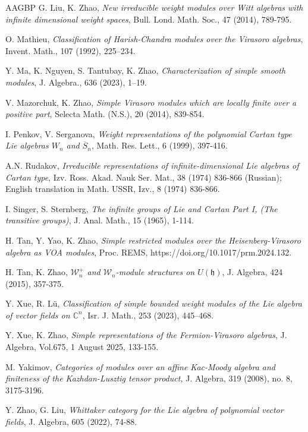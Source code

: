 \documentclass[12pt, a4paper]{amsart}
\theoremstyle{Theorem}
\theoremstyle{Theorem}
\numberwithin{equation}{section}
\begin{document}
\begin{thebibliography}{AAGBP}
 G. Liu, K. Zhao, {\it New irreducible weight modules over Witt algebras
	with infinite dimensional weight spaces}, Bull. Lond. Math. Soc., 47 (2014), 789-795.

 O. Mathieu, {\it Classification of Harish-Chandra modules over the Virasoro algebras}, Invent. Math., 107 (1992), 225–234.

 Y. Ma, K. Nguyen, S. Tantubay, K. Zhao, {\it Characterization of simple smooth modules}, J. Algebra., 636 (2023), 1–19.

 V. Mazorchuk, K. Zhao, {\it Simple Virasoro modules which are locally finite over a positive part}, Selecta Math. (N.S.), 20 (2014), 839-854.

 I. Penkov, V. Serganova, {\it Weight representations of the polynomial Cartan type Lie algebras $W_n$ and $\overline{S}_n$}, Math. Res. Lett., 6 (1999), 397-416.

 A.N. Rudakov, {\it Irreducible representations of infinite-dimensional Lie algebras of Cartan type},
Izv. Ross. Akad. Nauk Ser. Mat., 38 (1974) 836-866 (Russian); English translation in Math. USSR, Izv., 8 (1974) 836-866.

 I. Singer, S. Sternberg, {\it The infinite groups of Lie and Cartan Part I, (The transitive groups)}, J. Anal. Math., 15 (1965), 1-114.

 H. Tan,  Y. Yao,   K. Zhao, {\it Simple restricted modules over the   Heisenberg-Virasoro algebra as VOA modules}, Proc. REMS, https://doi.org/10.1017/prm.2024.132.


 H. Tan, K. Zhao, {\it $\mathcal{W}_{n}^{+}$ and $\mathcal{W}_{n}$-module structures on $U(\mathfrak{h})$},
J. Algebra, 424 (2015), 357-375.


 Y. Xue, R. Lü, {\it Classification of simple bounded weight modules of the Lie algebra of vector fields on $\mathbb{C}^n$}, Isr. J. Math., 253 (2023), 445–468. 

 Y. Xue, K. Zhao, {\it Simple representations of the Fermion-Virasoro algebras}, J. Algebra, Vol.675, 1 August 2025,   133-155.

M. Yakimov, {\it Categories of modules over an affine Kac-Moody algebra and finiteness of the 
	Kazhdan-Lusztig tensor product,} J. Algebra, 319 (2008), no. 8, 3175-3196.

 Y. Zhao, G. Liu, {\it Whittaker category for the Lie algebra of polynomial vector fields}, J. Algebra, 605 (2022), 74-88.

\end{thebibliography}
\end{document}

